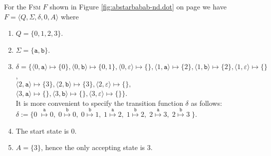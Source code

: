 \exampleEng
For the \textsc{Fsm} $F$ shown in Figure \ref{fig:abstarbabab-nd.dot} on page \pageref{fig:abstarbabab-nd.dot} 
we have
\\[0.2cm]
\hspace*{1.3cm}
$F = \langle Q, \Sigma, \delta, 0, A\rangle$ \quad where
\begin{enumerate}
\item $Q = \{ 0, 1, 2, 3 \}$.
\item $\Sigma = \{ \texttt{a}, \texttt{b} \}$.
\item $\delta = \bigl\{ 
       \langle 0, \texttt{a}  \rangle \mapsto \{ 0 \},
       \langle 0, \texttt{b}  \rangle \mapsto \{ 0, 1 \},
       \langle 0, \varepsilon \rangle \mapsto \{ \},
       \langle 1, \texttt{a}  \rangle \mapsto \{ 2 \},
       \langle 1, \texttt{b}  \rangle \mapsto \{ 2 \},
       \langle 1, \varepsilon \rangle \mapsto \{  \}$,
      \\[0.2cm]
      \hspace*{0.74cm}
      $\langle 2, \texttt{a}  \rangle \mapsto \{ 3 \},
       \langle 2, \texttt{b}  \rangle \mapsto \{ 3 \}, 
       \langle 2, \varepsilon \rangle \mapsto \{ \},$
      \\[0.2cm]
      \hspace*{0.74cm}
      $\langle 3, \texttt{a}  \rangle \mapsto \{\},
       \langle 3, \texttt{b}  \rangle \mapsto \{\}, 
       \langle 3, \varepsilon \rangle \mapsto \{\}\bigr\}$.
      \\[0.2cm]
      It is more convenient to specify the transition function $\delta$ as follows:
      \\[0.2cm]
      \hspace*{1.3cm}
       $\delta := \bigl\{0\;  \stackrel{\texttt{a}}{\mapsto} 0,\;
        0 \stackrel{\texttt{b}}{\mapsto} 0,\;
        0 \stackrel{\texttt{b}}{\mapsto} 1,\;
        1 \stackrel{\texttt{a}}{\mapsto} 2,\;
        1 \stackrel{\texttt{b}}{\mapsto} 2,\;
        2 \stackrel{\texttt{a}}{\mapsto} 3,\;
       2 \stackrel{\texttt{b}}{\mapsto} 3\;\bigr\}$.
\item The start state is $0$.
\item $A = \{ 3 \}$, hence the only accepting state is $3$. \eox
\end{enumerate}
\vspace*{0.3cm}

